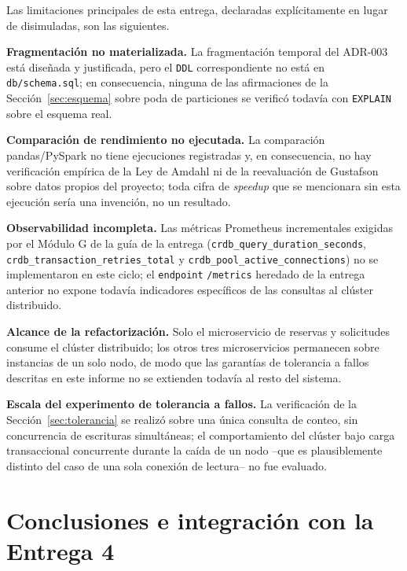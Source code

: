 \documentclass[10pt,twocolumn]{article}
\begin{document}
Las limitaciones principales de esta entrega, declaradas explícitamente en
lugar de disimuladas, son las siguientes.

\textbf{Fragmentación no materializada.} La fragmentación temporal del
ADR-003 está diseñada y justificada, pero el \texttt{DDL} correspondiente
no está en \texttt{db/schema.sql}; en consecuencia, ninguna de las
afirmaciones de la Sección~\ref{sec:esquema} sobre poda de particiones se
verificó todavía con \texttt{EXPLAIN} sobre el esquema real.

\textbf{Comparación de rendimiento no ejecutada.} La comparación
pandas/PySpark no tiene ejecuciones registradas y, en consecuencia, no hay
verificación empírica de la Ley de Amdahl ni de la reevaluación de
Gustafson sobre datos propios del proyecto; toda cifra de \emph{speedup}
que se mencionara sin esta ejecución sería una invención, no un resultado.

\textbf{Observabilidad incompleta.} Las métricas Prometheus incrementales
exigidas por el Módulo G de la guía de la entrega
(\texttt{crdb\_query\_duration\_seconds},
\texttt{crdb\_transaction\_retries\_total} y
\texttt{crdb\_pool\_active\_connections}) no se implementaron en este
ciclo; el \texttt{endpoint} \texttt{/metrics} heredado de la entrega
anterior no expone todavía indicadores específicos de las consultas al
clúster distribuido.

\textbf{Alcance de la refactorización.} Solo el microservicio de
reservas y solicitudes consume el clúster distribuido; los otros tres
microservicios permanecen sobre instancias de un solo nodo, de modo que
las garantías de tolerancia a fallos descritas en este informe no se
extienden todavía al resto del sistema.

\textbf{Escala del experimento de tolerancia a fallos.} La verificación de
la Sección~\ref{sec:tolerancia} se realizó sobre una única consulta de
conteo, sin concurrencia de escrituras simultáneas; el comportamiento del
clúster bajo carga transaccional concurrente durante la caída de un nodo
--que es plausiblemente distinto del caso de una sola conexión de
lectura-- no fue evaluado.

\section{Conclusiones e integración con la Entrega 4}
\label{sec:conclusiones}
\end{document}
